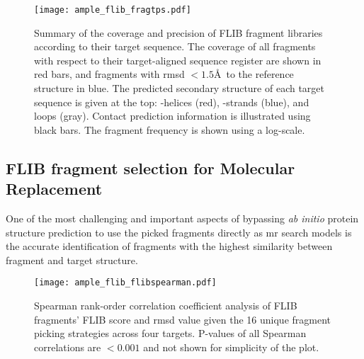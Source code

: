 \begin{figure}[H]
	\centering
	\texttt{[image: ample\_flib\_fragtps.pdf]}
	\caption[Coverage and precision of Flib fragment libraries]{Summary of the coverage and precision of FLIB fragment libraries according to their target sequence. The coverage of all fragments with respect to their target-aligned sequence register are shown in red bars, and fragments with \gls{rmsd} $<1.5$\AA\ to the reference structure in blue. The predicted secondary structure of each target sequence is given at the top: \textalpha-helices (red), \textbeta-strands (blue), and loops (gray). Contact prediction information is illustrated using black bars. The fragment frequency is shown using a log-scale.}
	\label{fig:ample_flib_fragtps}
\end{figure}

\subsection{FLIB fragment selection for Molecular Replacement}
One of the most challenging and important aspects of bypassing \textit{ab initio} protein structure prediction to use the picked fragments directly as \gls{mr} search models is the accurate identification of fragments with the highest similarity between fragment and target structure.

\begin{figure}[H]
	\centering
	\texttt{[image: ample\_flib\_flibspearman.pdf]}
        \caption[Spearman rank-order correlation coefficient analysis of FLIB fragments]{Spearman rank-order correlation coefficient analysis of FLIB fragments' FLIB score and \gls{rmsd} value given the 16 unique fragment picking strategies across four targets. P-values of all Spearman correlations are $<0.001$ and not shown for simplicity of the plot.}
	\label{fig:ample_flib_flibspearman}
\end{figure}

